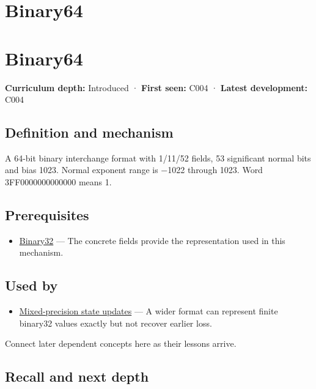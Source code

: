 \hypertarget{appendix-5078dfab64e6}{}
\section*{Binary64}
\section{Binary64}\label{appendix-5078dfab64e6-binary64}

\textbf{Curriculum depth:} Introduced · \textbf{First seen:} C004 · \textbf{Latest development:} C004

\subsection{Definition and mechanism}\label{appendix-5078dfab64e6-definition-and-mechanism}

A 64-bit binary interchange format with 1/11/52 fields, 53 significant normal bits and bias 1023. Normal exponent range is −1022 through 1023. Word 3FF0000000000000 means 1.

\subsection{Prerequisites}\label{appendix-5078dfab64e6-prerequisites}

\begin{itemize}
\tightlist
\item
  \hyperref[appendix-5057f9ad327f]{Binary32} --- The concrete fields provide the representation used in this mechanism.
\end{itemize}

\subsection{Used by}\label{appendix-5078dfab64e6-used-by}

\begin{itemize}
\tightlist
\item
  \hyperref[appendix-260182e617b7]{Mixed-precision state updates} --- A wider format can represent finite binary32 values exactly but not recover earlier loss.
\end{itemize}

Connect later dependent concepts here as their lessons arrive.

\subsection{Recall and next depth}\label{appendix-5078dfab64e6-recall-and-next-depth}

